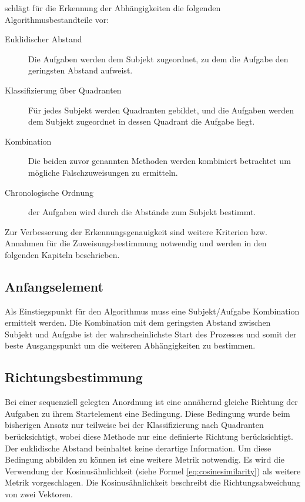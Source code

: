 \citet{max} schlägt für die Erkennung der Abhängigkeiten die folgenden Algorithmusbestandteile vor:
\begin{description}
	\item[Euklidischer Abstand] Die Aufgaben werden dem Subjekt zugeordnet, zu dem die Aufgabe den geringsten Abstand aufweist.
	\item[Klassifizierung über Quadranten] Für jedes Subjekt werden Quadranten gebildet, und die Aufgaben werden dem Subjekt zugeordnet in dessen Quadrant die Aufgabe liegt.
	\item[Kombination] Die beiden zuvor genannten Methoden werden kombiniert betrachtet um mögliche Falschzuweisungen zu ermitteln.
	\item[Chronologische Ordnung] der Aufgaben wird durch die Abstände zum Subjekt bestimmt.
\end{description}

Zur Verbesserung der Erkennungsgenauigkeit sind weitere Kriterien bzw. Annahmen für die Zuweisungsbestimmung notwendig und werden in den folgenden Kapiteln beschrieben.

\subsection{Anfangselement} %
\label{sub:anfangselement}
Als Einstiegspunkt für den Algorithmus muss eine Subjekt/Aufgabe Kombination ermittelt werden. Die Kombination mit dem geringsten Abstand zwischen Subjekt und Aufgabe ist der wahrscheinlichste Start des Prozesses und somit der beste Ausgangspunkt um die weiteren Abhängigkeiten zu bestimmen.
\subsection{Richtungsbestimmung} %
\label{sub:richtungsbestimmung}
Bei einer sequenziell gelegten Anordnung ist eine annähernd gleiche Richtung der Aufgaben zu ihrem Startelement eine Bedingung. Diese Bedingung wurde beim bisherigen Ansatz nur teilweise bei der Klassifizierung nach Quadranten berücksichtigt, wobei diese Methode nur eine definierte Richtung berücksichtigt. Der euklidische Abstand beinhaltet keine derartige Information. Um diese Bedingung abbilden zu können ist eine weitere Metrik notwendig. Es wird die Verwendung der Kosinusähnlichkeit (siehe Formel  \ref{eq:cosinesimilarity}) als weitere Metrik vorgeschlagen. Die Kosinusähnlichkeit beschreibt die Richtungsabweichung von zwei Vektoren.

